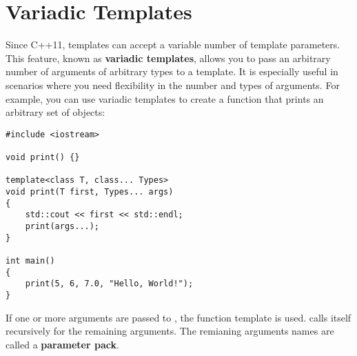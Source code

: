 \documentclass[12pt]{article}
\begin{document}
\section{Variadic Templates}

\noindent
Since C++11, templates can accept a variable number of template parameters.
This feature, known as \textbf{variadic templates}, allows you to pass an arbitrary number of arguments of arbitrary types to a template.
It is especially useful in scenarios where you need flexibility in the number and types of arguments.
For example, you can use variadic templates to create a function that prints an arbitrary set of objects:

\begin{lstlisting}[style=cxx]
#include <iostream>

void print() {}

template<class T, class... Types>
void print(T first, Types... args)
{
    std::cout << first << std::endl;
    print(args...);
}

int main()
{
    print(5, 6, 7.0, "Hello, World!");
}
\end{lstlisting}

\noindent
If one or more arguments are passed to , the function template is used.
 calls itself recursively for the remaining arguments.
The remianing arguments names  are called a \textbf{parameter pack}.
\end{document}

